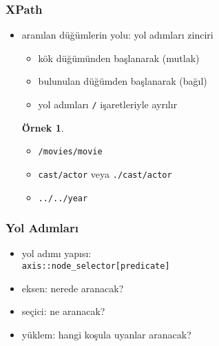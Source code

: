 \documentclass[dvipsnames]{beamer}
\theoremstyle{definition}
\theoremstyle{example}
\newtheorem{ornek}[theorem]{Örnek}
\theoremstyle{plain}
\begin{document}
\begin{frame}
  \frametitle{XPath}

  \begin{itemize}
    \item aranılan düğümlerin yolu: yol adımları zinciri
    \begin{itemize}
      \item kök düğümünden başlanarak (mutlak)
      \item bulunulan düğümden başlanarak (bağıl)

      \medskip
      \item yol adımları \lstinline!/! işaretleriyle ayrılır
    \end{itemize}

    \pause
    \begin{ornek}
      \begin{itemize}
       \item \lstinline!/movies/movie!
       \item \lstinline!cast/actor! veya \lstinline!./cast/actor!
       \item \lstinline!../../year!
      \end{itemize}
    \end{ornek}
  \end{itemize}
\end{frame}

\begin{frame}
  \frametitle{Yol Adımları}

  \begin{itemize}
    \item yol adımı yapısı:\\
      \lstinline!axis::node_selector[predicate]!

    \pause
    \medskip
    \item eksen: nerede aranacak?
    \item seçici: ne aranacak?
    \item yüklem: hangi koşula uyanlar aranacak?
  \end{itemize}
\end{frame}
\end{document}
